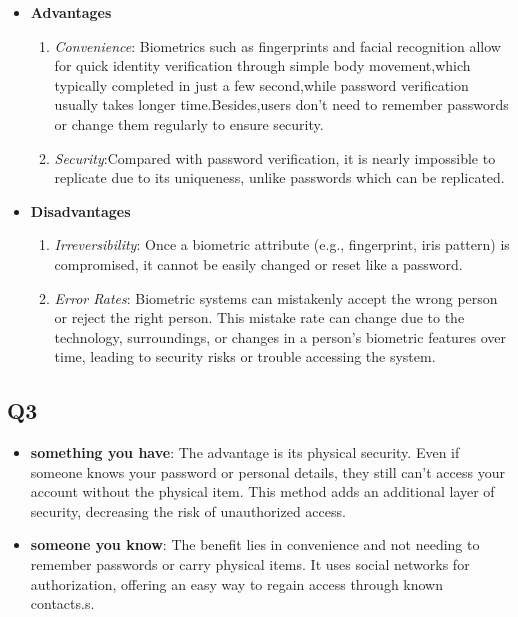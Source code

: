 \documentclass{article}
\begin{document}
	\begin{itemize}
		\item \textbf{Advantages}
		\begin{enumerate}
			\item \textit{Convenience}: Biometrics such as fingerprints and facial recognition allow for quick identity verification through simple body movement,which typically completed in just a few second,while password verification usually takes longer time.Besides,users don't need to remember passwords or change them regularly to ensure security.

			\item \textit{Security}:Compared with password verification, it is nearly impossible to replicate due to its uniqueness, unlike passwords which can be replicated.
		\end{enumerate}

		\item \textbf{Disadvantages}
		\begin{enumerate}
			\item \textit{Irreversibility}: Once a biometric attribute (e.g., fingerprint, iris pattern) is compromised, it cannot be easily changed or reset like a password.
			\item \textit{Error Rates}: Biometric systems can mistakenly accept the wrong person or reject the right person. This mistake rate can change due to the technology, surroundings, or changes in a person's biometric features over time, leading to security risks or trouble accessing the system\cite{o2003comparing}.
		\end{enumerate}


	\end{itemize}


\subsection{Q3}

	\begin{itemize}
		\item \textbf{something you have}: 
		The advantage is its physical security. Even if someone knows your password or personal details, they still can't access your account without the physical item. This method adds an additional layer of security, decreasing the risk of unauthorized access.

		\item \textbf{someone you know}:
		The benefit lies in convenience and not needing to remember passwords or carry physical items. It uses social networks for authorization, offering an easy way to regain access through known contacts.s.

	\end{itemize}
\end{document}
